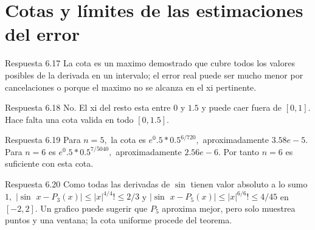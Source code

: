 \documentclass[10pt,a4paper,oneside,openany]{book}
\begin{document}
\section{Cotas y límites de las estimaciones del error}
\begin{PSevenAnswerFixed}{Respuesta 6.17}
La cota es un maximo demostrado que cubre todos los valores posibles de la derivada en un intervalo; el error real puede ser mucho menor por cancelaciones o porque el maximo no se alcanza en el xi pertinente.
\end{PSevenAnswerFixed}
\begin{PSevenAnswerFixed}{Respuesta 6.18}
No. El xi del resto esta entre \(0\) y \(1.5\) y puede caer fuera de \([0,1]\). Hace falta una cota valida en todo \([0,1.5]\).
\end{PSevenAnswerFixed}
\begin{PSevenAnswerFixed}{Respuesta 6.19}
Para \(n=5,\) la cota es \(e^{0}.5*0.5^{6/720},\) aproximadamente \(3.58e-5\). Para \(n=6\) es \(e^{0}.5*0.5^{7/5040},\) aproximadamente \(2.56e-6\). Por tanto \(n=6\) es suficiente con esta cota.
\end{PSevenAnswerFixed}
\begin{PSevenAnswerFixed}{Respuesta 6.20}
Como todas las derivadas de \(\sin\) tienen valor absoluto a lo sumo \(1,\) \(|\sin\) \(x-P_3(x)|\le |x|^{4/4}!\le 2/3\) y \(|\sin\) \(x-P_5(x)|\le |x|^{6/6}!\le 4/45\) en \([-2,2]\). Un grafico puede sugerir que \(P_5\) aproxima mejor, pero solo muestrea puntos y una ventana; la cota uniforme procede del teorema.
\end{PSevenAnswerFixed}
\end{document}
